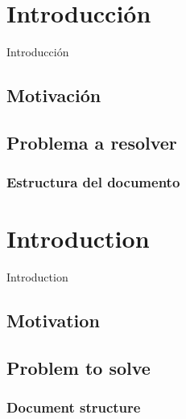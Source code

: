 \chapter{Introducción} %
	
Introducción


\section{Motivación}


\section{Problema a resolver}


\subsection{Estructura del documento}



\chapter{Introduction} %

Introduction


\section{Motivation}


\section{Problem to solve}


\subsection{Document structure}




